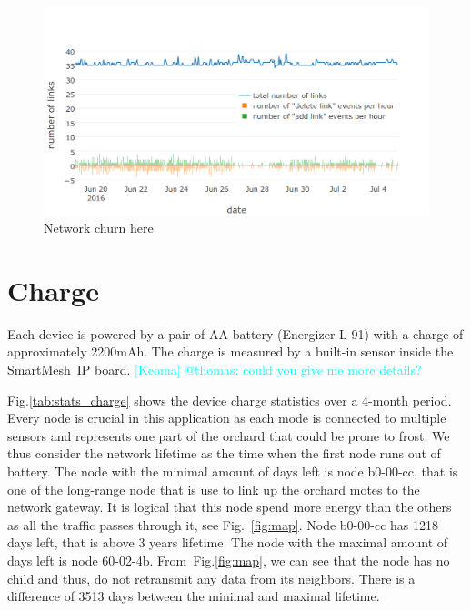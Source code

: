 \documentclass{sig-alternate}
\newcommand{\keoma}[1]              {\textcolor{cyan}{[Keoma] #1}}
\newcommand{\smip}                  {SmartMesh~IP\xspace}
\begin{document}
\begin{figure}
    \centering
    \includegraphics[width=\columnwidth]{net_churn}
    \caption{Network churn here}
    \label{fig:net_churn}
\end{figure}

\section{Charge}
\label{sec:charge}


Each device is powered by a pair of AA battery (Energizer L-91) with a charge of approximately 2200mAh.
The charge is measured by a built-in sensor inside the \smip board. \keoma{@thomas: could you give me more details?}


Fig.\ref{tab:stats_charge} shows the device charge statistics over a 4-month period.
Every node is crucial in this application as each mode is connected to multiple sensors and represents one part of the orchard that could be prone to frost.
We thus consider the network lifetime as the time when the first node runs out of battery.
The node with the minimal amount of days left is node b0-00-cc, that is one of the long-range node that is use to link up the orchard motes to the network gateway.
It is logical that this node spend more energy than the others as all the traffic passes through it, see Fig.~\ref{fig:map}.
Node b0-00-cc has 1218 days left, that is above 3 years lifetime.
The node with the maximal amount of days left is node 60-02-4b.
From~Fig.\ref{fig:map}, we can see that the node has no child and thus, do not retransmit any data from its neighbors.
There is a difference of 3513 days between the minimal and maximal lifetime.
\end{document}
